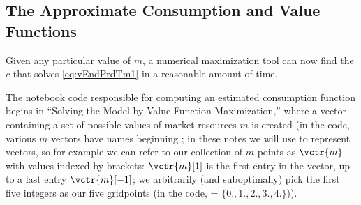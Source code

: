 \documentclass[titlepage, headings=optiontotocandhead]{econtex}
\begin{document}
\hypertarget{the-approximate-consumption-and-value-functions}{}
\subsection{The Approximate Consumption and Value Functions}

Given any particular value of $m$, a numerical maximization tool can now find the $c$ that solves \eqref{eq:vEndPrdTm1} in a reasonable amount of time.

The notebook code responsible for computing an estimated consumption function begins in ``Solving the Model by Value Function Maximization,'' where a vector containing a set of possible values of market resources $m$ is created (in the code, various $m$ vectors have names beginning {\mVec}; in these notes we will use {\vctrNotationDescribe} to represent vectors, so for example we can refer to our collection of $m$ points as $\vctr{m}$ with values indexed by brackets: $\vctr{m}[1]$ is the first entry in the vector, up to a last entry $\vctr{m}[-1]$; we arbitrarily (and suboptimally) pick the first five integers as our five {\mVec}  gridpoints (in the code, = $\{0.,1.,2.,3.,4.\}$)).

\end{document}
